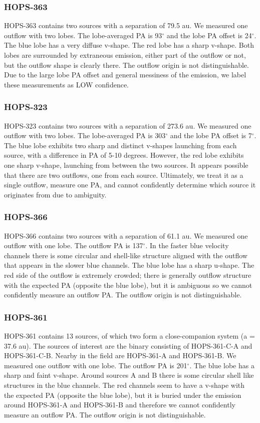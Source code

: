 \documentclass[linenumbers,twocolumn, twocolappendix]{aastex631}
\begin{document}
\subsubsection{HOPS-363}
HOPS-363 contains two sources with a separation of 79.5 au. We measured one outflow with two lobes. The lobe-averaged PA is 93$^\circ$ and the lobe PA offset is 24$^\circ$. The blue lobe has a very diffuse v-shape. The red lobe has a sharp v-shape. Both lobes are surrounded by extraneous emission, either part of the outflow or not, but the outflow shape is clearly there. The outflow origin is not distinguishable. Due to the large lobe PA offset and general messiness of the emission, we label these measurements as LOW confidence.

\subsubsection{HOPS-323}
HOPS-323 contains two sources with a separation of 273.6 au. We measured one outflow with two lobes. The lobe-averaged PA is 303$^\circ$ and the lobe PA offset is 7$^\circ$. The blue lobe exhibits two sharp and distinct v-shapes launching from each source, with a difference in PA of 5-10 degrees. However, the red lobe exhibits one sharp v-shape, launching from between the two sources. It appears possible that there are two outflows, one from each source. Ultimately, we treat it as a single outflow, measure one PA, and cannot confidently determine which source it originates from due to ambiguity.

\subsubsection{HOPS-366}
HOPS-366 contains two sources with a separation of 61.1 au. We measured one outflow with one lobe. The outflow PA is 137$^\circ$. In the faster blue velocity channels there is some circular and shell-like structure aligned with the outflow that appears in the slower blue channels. The blue lobe has a sharp u-shape. The red side of the outflow is extremely crowded; there is generally outflow structure with the expected PA (opposite the blue lobe), but it is ambiguous so we cannot confidently measure an outflow PA. The outflow origin is not distinguishable. 

\subsubsection{HOPS-361}
HOPS-361 contains 13 sources, of which two form a close-companion system (a = 37.6 au). The sources of interest are the binary consisting of HOPS-361-C-A and HOPS-361-C-B. Nearby in the field are HOPS-361-A and HOPS-361-B. We measured one outflow with one lobe. The outflow PA is 201$^\circ$. The blue lobe has a sharp and faint v-shape. Around sources A and B there is some circular shell like structures in the blue channels. The red channels seem to have a v-shape with the expected PA (opposite the blue lobe), but it is buried under the emission around HOPS-361-A and HOPS-361-B and therefore we cannot confidently measure an outflow PA. The outflow origin is not distinguishable. 
\end{document}
